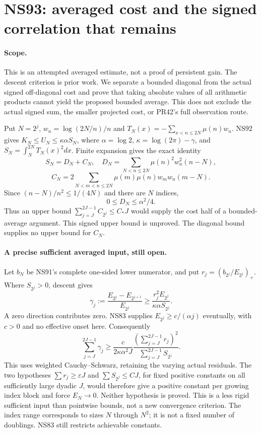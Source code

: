 \section*{NS93: averaged cost and the signed correlation that remains}
\paragraph{Scope.} This is an attempted averaged estimate, not a proof of
persistent gain. The descent criterion is prior work. We separate a bounded
diagonal from the actual signed off-diagonal cost and prove that taking
absolute values of all arithmetic products cannot yield the proposed bounded
average. This does not exclude the actual signed sum, the smaller projected
cost, or PR42's full observation route.

Put $N=2^j$, $w_n=\log(2N/n)/n$ and
$T_N(x)=-\sum_{x<n\le2N}\mu(n)w_n$. NS92 gives
$K_N\le U_N\le\kappa\alpha S_N$, where $\alpha=\log2$,
$\kappa=\log(2\pi)-\gamma$, and $S_N=\int_N^{2N}T_N(x)^2dx$.
Finite expansion gives the exact identity
\[
 S_N=D_N+C_N,\quad D_N=\sum_{N<n\le2N}\mu(n)^2w_n^2(n-N),
\]
\[
 C_N=2\sum_{N<m<n\le2N}\mu(m)\mu(n)w_mw_n(m-N).
\]
Since $(n-N)/n^2\le1/(4N)$ and there are $N$ indices,
\[
 0\le D_N\le \alpha^2/4.
\]
Thus an upper bound $\sum_{j=J}^{2J-1} C_{2^j}\le C_*J$ would
supply the cost half of a bounded-average argument. This signed upper bound
is unproved. The diagonal bound supplies no upper bound for $C_N$.

\paragraph{A precise sufficient averaged input, still open.}
Let $b_N$ be NS91's complete one-sided lower numerator, and put
$r_j=(b_{2^j}/E_{2^j})_+$. Where $S_{2^j}>0$, descent gives
\[
 \gamma_j:=\frac{E_{2^j}-E_{2^{j+1}}}{E_{2^j}}
 \ge\frac{r_j^2 E_{2^j}}{\kappa\alpha S_{2^j}}.
\]
A zero direction contributes zero. NS83 supplies $E_{2^j}\ge c/(\alpha j)$
eventually, with $c>0$ and no effective onset here. Consequently
\[
 \sum_{j=J}^{2J-1}\gamma_j
 \ge\frac{c}{2\kappa\alpha^2J}
       \frac{(\sum_{j=J}^{2J-1}r_j)^2}
            {\sum_{j=J}^{2J-1}S_{2^j}}.
\]
This uses weighted Cauchy--Schwarz, retaining the varying actual residuals.
The two hypotheses $\sum r_j\ge\varepsilon J$ and
$\sum S_{2^j}\le C J$, for fixed positive constants on all sufficiently
large dyadic $J$, would therefore give a positive constant per growing
index block and force $E_N\to0$. Neither hypothesis is proved. This is a
less rigid sufficient input than pointwise bounds, not a new convergence
criterion. The index range corresponds to sizes $N$ through $N^2$; it is
not a fixed number of doublings. NS83 still restricts achievable constants.

